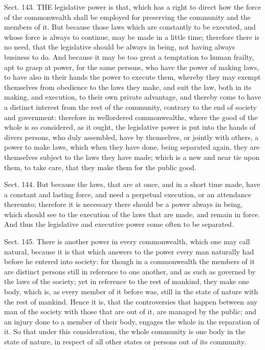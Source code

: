 \documentclass[11pt,openany]{book}
\begin{document}
Sect. 143. THE legislative power is that, which has a right to direct how the force of the commonwealth shall be employed for preserving the community and the members of it. But because those laws which are constantly to be executed, and whose force is always to continue, may be made in a little time; therefore there is no need, that the legislative should be always in being, not having always business to do. And because it may be too great a temptation to human frailty, apt to grasp at power, for the same persons, who have the power of making laws, to have also in their hands the power to execute them, whereby they may exempt themselves from obedience to the laws they make, and suit the law, both in its making, and execution, to their own private advantage, and thereby come to have a distinct interest from the rest of the community, contrary to the end of society and government: therefore in wellordered commonwealths, where the good of the whole is so considered, as it ought, the legislative power is put into the hands of divers persons, who duly assembled, have by themselves, or jointly with others, a power to make laws, which when they have done, being separated again, they are themselves subject to the laws they have made; which is a new and near tie upon them, to take care, that they make them for the public good.

Sect. 144. But because the laws, that are at once, and in a short time made, have a constant and lasting force, and need a perpetual execution, or an attendance thereunto; therefore it is necessary there should be a power always in being, which should see to the execution of the laws that are made, and remain in force. And thus the legislative and executive power come often to be separated.

Sect. 145. There is another power in every commonwealth, which one may call natural, because it is that which answers to the power every man naturally had before he entered into society: for though in a commonwealth the members of it are distinct persons still in reference to one another, and as such as governed by the laws of the society; yet in reference to the rest of mankind, they make one body, which is, as every member of it before was, still in the state of nature with the rest of mankind. Hence it is, that the controversies that happen between any man of the society with those that are out of it, are managed by the public; and an injury done to a member of their body, engages the whole in the reparation of it. So that under this consideration, the whole community is one body in the state of nature, in respect of all other states or persons out of its community.
\end{document}
